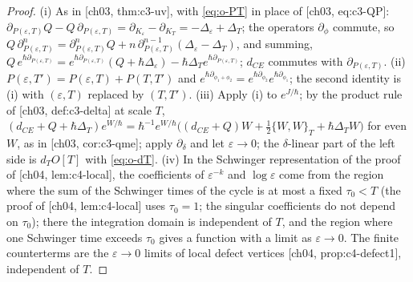 \begin{proof}
(i) As in [ch03, thm:c3-uv], with \eqref{eq:o-PT} in place of [ch03, eq:c3-QP]: $\partial_{P(\varepsilon,T)}Q-Q\,\partial_{P(\varepsilon,T)}=\partial_{K_\varepsilon}-\partial_{K_T}=-\Delta_\varepsilon+\Delta_T$; the operators $\partial_\phi$ commute, so $Q\,\partial^n_{P(\varepsilon,T)}=\partial^n_{P(\varepsilon,T)}Q+n\,\partial^{n-1}_{P(\varepsilon,T)}(\Delta_\varepsilon-\Delta_T)$, and summing, $Q\,e^{\hbar\partial_{P(\varepsilon,T)}}=e^{\hbar\partial_{P(\varepsilon,T)}}(Q+\hbar\Delta_\varepsilon)-\hbar\Delta_Te^{\hbar\partial_{P(\varepsilon,T)}}$; $d_{CE}$ commutes with $\partial_{P(\varepsilon,T)}$. (ii) $P(\varepsilon,T')=P(\varepsilon,T)+P(T,T')$ and $e^{\hbar\partial_{\phi_1+\phi_2}}=e^{\hbar\partial_{\phi_2}}e^{\hbar\partial_{\phi_1}}$; the second identity is (i) with $(\varepsilon,T)$ replaced by $(T,T')$. (iii) Apply (i) to $e^{J/\hbar}$; by the product rule of [ch03, def:c3-delta] at scale $T$, $(d_{CE}+Q+\hbar\Delta_T)e^{W/\hbar}=\hbar^{-1}e^{W/\hbar}\big((d_{CE}+Q)W+\tfrac12\{W,W\}_T+\hbar\Delta_TW\big)$ for even $W$, as in [ch03, cor:c3-qme]; apply $\partial_\delta$ and let $\varepsilon\to0$; the $\delta$-linear part of the left side is $d_TO[T]$ with \eqref{eq:o-dT}. (iv) In the Schwinger representation of the proof of [ch04, lem:c4-local], the coefficients of $\varepsilon^{-k}$ and $\log\varepsilon$ come from the region where the sum of the Schwinger times of the cycle is at most a fixed $\tau_0<T$ (the proof of [ch04, lem:c4-local] uses $\tau_0=1$; the singular coefficients do not depend on $\tau_0$); there the integration domain is independent of $T$, and the region where one Schwinger time exceeds $\tau_0$ gives a function with a limit as $\varepsilon\to0$. The finite counterterms are the $\varepsilon\to0$ limits of local defect vertices [ch04, prop:c4-defect1], independent of $T$.
\end{proof}

